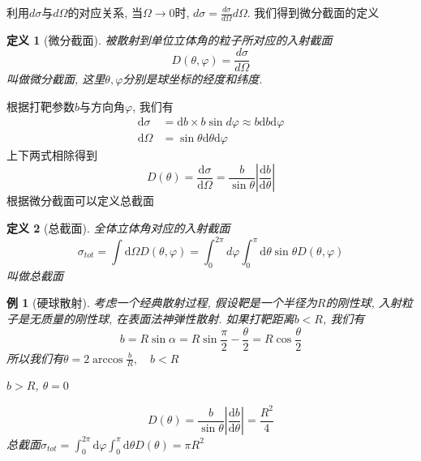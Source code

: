 \documentclass[a4paper,11pt]{book}
\newtheorem{definition}{\hspace{2em}定义}[section]
\newtheorem{example}{例}[section]
\newcommand{\md}{\mathrm{d}}
\begin{document}
利用$d\sigma$与$d\Omega$的对应关系, 当$\Omega\to0$时, $d\sigma=\frac{d\sigma}{d\Omega}d\Omega$. 我们得到微分截面的定义
\begin{definition}[微分截面]
  被散射到单位立体角的粒子所对应的入射截面
  \begin{equation}
    D(\theta,\varphi)=\frac{d\sigma}{d\Omega}
  \end{equation}
  叫做微分截面, 这里$\theta,\varphi$分别是球坐标的经度和纬度.
\end{definition}
根据打靶参数$b$与方向角$\varphi$, 我们有
\begin{equation}
  \begin{split}
     \md\sigma&=\md b\times b\sin{d\varphi}\approx b\md b\md\varphi\\
       \md\Omega&=\sin{\theta}\md\theta\md\varphi
  \end{split}
\end{equation}
上下两式相除得到
\begin{equation}
  D(\theta)=\frac{\md\sigma}{\md\Omega}=\frac{b}{\sin{\theta}}\left|\frac{\md b}{\md\theta}\right|
\end{equation}
根据微分截面可以定义总截面
\begin{definition}[总截面]
  全体立体角对应的入射截面
  \begin{equation}
    \sigma_{tot}=\int \md\Omega D(\theta,\varphi)=\int_{0}^{2\pi}d\varphi\int_{0}^{\pi}\md\theta\sin{\theta}D(\theta,\varphi)
  \end{equation}
  叫做总截面
\end{definition}
\begin{example}[硬球散射]
  考虑一个经典散射过程, 假设靶是一个半径为$R$的刚性球, 入射粒子是无质量的刚性球, 在表面法神弹性散射. 如果打靶距离$b<R$, 我们有
  \begin{equation}
    b=R\sin{\alpha}=R\sin{\frac{\pi}{2}-\frac{\theta}{2}}=R\cos{\frac{\theta}{2}}
  \end{equation}
  所以我们有$\theta=2\arccos{\frac{b}{R}},\quad b<R$

  $b>R$, $\theta=0$

  \begin{equation}
    D(\theta)=\frac{b}{\sin{\theta}}\left|\frac{\md b}{\md\theta}\right|=\frac{R^2}{4}
  \end{equation}
  总截面$\sigma_{tot}=\int_{0}^{2\pi}\md\varphi\int_{0}^{\pi}\md\theta D(\theta)=\pi R^2$
\end{example}
\end{document}
